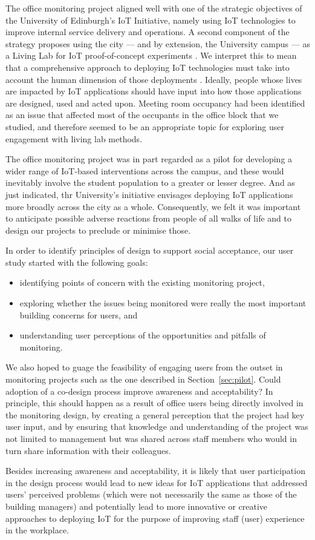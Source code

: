 The office monitoring project aligned well with one of the strategic objectives of the University of Edinburgh's IoT Initiative, namely using IoT technologies to improve internal service delivery and operations. A second component of the strategy proposes using the city --- and by extension, the University campus --- as a Living Lab for IoT proof-of-concept experiments \cite{IoT-Strategy}. We interpret this to mean that a comprehensive approach to deploying IoT technologies must take into account the human dimension of those deployments \cite{Shin-2017-UTIO}. Ideally, people whose lives are impacted by IoT applications should have input into how those applications are designed, used and acted upon. Meeting room occupancy had been identified as an issue that affected most of the occupants in the office block that we studied, and therefore seemed to be an appropriate topic for exploring user engagement with living lab methods.

The office monitoring project was in part regarded as a pilot for developing a wider range of IoT-based interventions across the campus, and these would inevitably involve the student population to a greater or lesser degree. And as just indicated, thr University's initiative envisages deploying IoT applications more broadly across the city as a whole. Consequently, we felt it was important to anticipate possible adverse reactions from people of all walks of life and to design our projects to preclude or minimise those. 

In order to identify principles of design to support social acceptance, our user study started with the following goals:
\begin{itemize}
\item identifying points of concern with the existing monitoring project,
\item exploring whether the issues being monitored were really the most important building concerns for users, and
\item understanding user perceptions of the opportunities and pitfalls of monitoring.
\end{itemize}

We also hoped to guage the feasibility of engaging users from the outset in monitoring projects such as the one described in Section~\ref{sec:pilot}. Could adoption of a co-design process improve awareness and acceptability? In principle, this should happen as a result of office users being directly involved in the monitoring design, by creating a general perception that the project had key user input, and by ensuring that knowledge and understanding of the project was not limited to management but was shared across staff members who would in turn share information with their colleagues.

Besides increasing awareness and acceptability, it is likely that user participation in the design process would lead to new ideas for IoT applications that addressed users’ perceived problems (which were not necessarily the same as those of the building managers) and potentially lead to more innovative or creative approaches to deploying IoT for the purpose of improving staff (user) experience in the workplace. 

